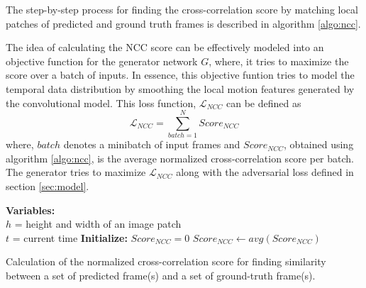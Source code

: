 \documentclass{article}
\begin{document}
  The step-by-step process for finding the cross-correlation score by matching local patches of predicted and ground truth frames is described in algorithm \ref{algo:ncc}.
  
  The idea of calculating the NCC score can be effectively modeled into an objective function for the generator network $ G $, where, it tries to maximize the score over a batch of inputs. In essence, this objective funtion tries to model the temporal data distribution by smoothing the local motion features generated by the convolutional model. This loss function, $ \mathcal{L}_{NCC} $ can be defined as
  \begin{equation}
  	\mathcal{L}_{NCC} = \sum_{batch = 1}^{N}Score_{NCC}
  	\label{eq:lncc}
  \end{equation}
  where, $ batch $ denotes a minibatch of input frames and $ Score_{NCC} $, obtained using algorithm \ref{algo:ncc}, is the average normalized cross-correlation score per batch. The generator tries to maximize $ \mathcal{L}_{NCC} $ along with the adversarial loss defined in section \ref{sec:model}.
  
  \begin{algorithm}[!htbp]
  	\SetAlgoLined
  	\textbf{Variables:}\\
  	$ h $ = height and width of an image patch\\
  	$ t $ = current time\;
  	\textbf{Initialize:} $ Score_{NCC} = 0 $\;
  	$ Score_{NCC} \leftarrow avg(Score_{NCC}) $\;
  \caption{Calculation of the normalized cross-correlation score for finding similarity between a set of predicted frame(s) and a set of ground-truth frame(s).}
  \label{algo:ncc}
\end{algorithm}
\end{document}
